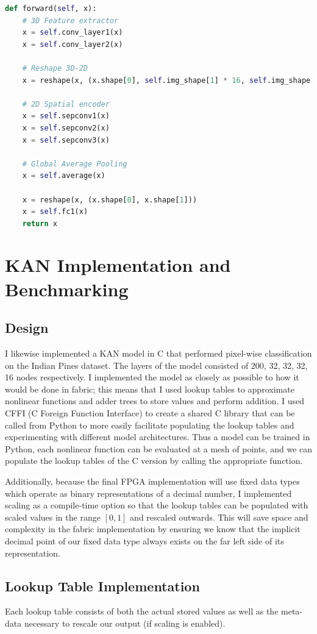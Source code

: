 \documentclass[psamsfonts]{amsart}
\theoremstyle{definition}
\theoremstyle{remark}
\numberwithin{equation}{section}
\begin{document}
\begin{lstlisting}[language=python]
def forward(self, x):
    # 3D Feature extractor
    x = self.conv_layer1(x)
    x = self.conv_layer2(x)

    # Reshape 3D-2D
    x = reshape(x, (x.shape[0], self.img_shape[1] * 16, self.img_shape[2], self.img_shape[3]))

    # 2D Spatial encoder
    x = self.sepconv1(x)
    x = self.sepconv2(x)
    x = self.sepconv3(x)

    # Global Average Pooling
    x = self.average(x)

    x = reshape(x, (x.shape[0], x.shape[1]))
    x = self.fc1(x)
    return x

\end{lstlisting}

\section{KAN Implementation and Benchmarking}
\subsection{Design}
I likewise implemented a KAN model in C that performed pixel-wise classification on the Indian Pines dataset. The layers of the model consisted of 200, 32, 32, 32, 16 nodes respectively. I implemented the model as closely as possible to how it would be done in fabric; this means that I used lookup tables to approximate nonlinear functions and adder trees to store values and perform addition. I used CFFI (C Foreign Function Interface) to create a shared C library that can be called from Python to more easily facilitate populating the lookup tables and experimenting with different model architectures. Thus a model can be trained in Python, each nonlinear function can be evaluated at a mesh of points, and we can populate the lookup tables of the C version by calling the appropriate function.

Additionally, because the final FPGA implementation will use fixed data types which operate as binary representations of a decimal number, I implemented scaling as a compile-time option so that the lookup tables can be populated with scaled values in the range $[0,1]$ and rescaled outwards. This will save space and complexity in the fabric implementation by ensuring we know that the implicit decimal point of our fixed data type always exists on the far left side of its representation.

\subsection{Lookup Table Implementation}
Each lookup table consists of both the actual stored values as well as the meta-data necessary to rescale our output (if scaling is enabled).
\end{document}
